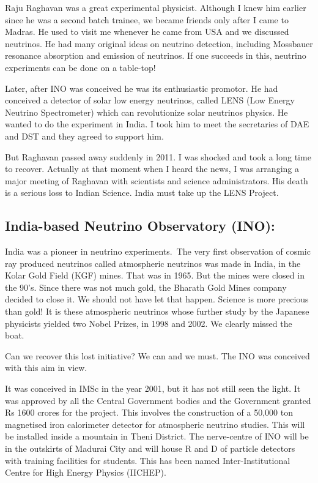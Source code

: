Raju Raghavan was a great experimental physicist. Although I knew him 
earlier since he was a second batch trainee, we becam\-e friends only 
after I came to Madras. He used to visit me whenever he came from USA 
and we discussed neutrinos. He had many origina\-l ideas on neutrino 
detection, including Mossbauer resonance absorption and emission of 
neutrinos. If one succeeds in this, neutrino experiments can be done on 
a table-top!


Later, after INO was conceived he was its enthusiastic promotor. He had 
conceived a detector of solar low energy neutrinos, called LENS (Low 
Energy Neutrino Spectrometer) which can revolutionize solar neutrinos 
physics. He wanted to do the experi\-ment in India. I took him to meet the 
secretaries of DAE and DST and they agreed to support him.


But Raghavan passed away suddenly in 2011. I was shocked and took a long 
time to recover. Actually at that moment when I heard the news, I was 
arranging a major meeting of Raghavan with scientists and science 
administrators. His death is a serious loss to Indian Science. India 
must take up the LENS Project.

\vspace{-.2cm}

\subsection*{India-based Neutrino Observatory (INO):}

India was a pioneer in neutrino experiments.\ The very first observation 
of cosmic ray produced neutrinos called atmospheric neutrinos was made 
in India, in the Kolar Gold Field (KGF) mines. That was in 1965. But the 
mines were closed in the 90's. Since there was not much gold, the 
Bharath Gold Mines company decided to close it. We should not have let 
that happen. Science is more precious than gold! It is these atmospheric 
neutrinos whose further study by the Japanese physicists yielded two 
Nobel Prizes, in 1998 and 2002. We clearly missed the boat.

Can we recover this lost initiative? We can and we must. The INO was 
conceived with this aim in view.

It was conceived in IMSc in the year 2001, but it has not still seen the 
light. It was approved by all the Central Government bodies and the 
Government granted Rs 1600 crores for the pro\-ject. This involves the 
construction of a 50,000 ton magnetised iron calorimeter detector for 
atmospheric neutrino studies. This will be installed inside a mountain 
in Theni District. The nerve-centre of INO will be in the outskirts of 
Madurai City and will house R and D of particle detectors with training 
facilities for students. This has been named Inter-Institutional Centre 
for High Energy Physics (IICHEP).

